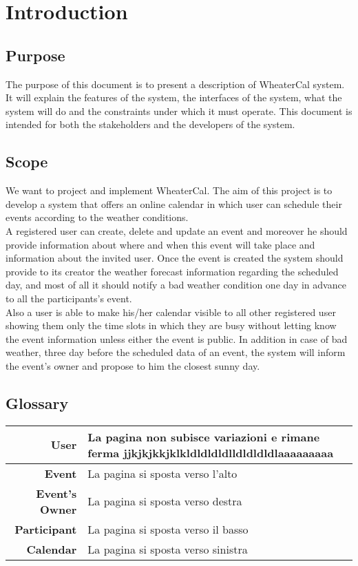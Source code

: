 \chapter{Introduction} \label{cap:cap1}

\section{Purpose}
The purpose of this document is to present a description of WheaterCal system. It will explain the features of the system, the interfaces of the system, what the system will do and the constraints under which it must operate.
This document is intended for both the stakeholders and the developers of the system.

\section{Scope}
We want to project and implement WheaterCal. The aim of this project is to develop a system that offers an online calendar in which user can schedule their events according to the weather conditions.\\ A registered user can create, delete and update an event and moreover he should provide information about where and when this event will take place and information about the invited user.
Once the event is created the system should provide to its creator the weather forecast information regarding the scheduled day, and most of all it should notify a bad weather condition one day in advance to all the participants's event.\\
Also a user is able to make his/her calendar visible to all other registered user showing them only the time slots in which they are busy without letting know the event information unless either the event is public.
In addition in case of bad weather, three day before the scheduled data of an event, the system will inform the event's owner and propose to him the closest sunny day.

\section{Glossary}
\begin{tabularx}{\linewidth}{|r|X|}
  \hline  {\bf User} & La pagina non subisce variazioni e rimane ferma jjkjkjkkjklkldldldldlldldldldlaaaaaaaaa\\ 
  \hline  {\bf Event} & La pagina si sposta verso l'alto \\ 
  \hline  {\bf Event's Owner} & La pagina si sposta verso destra\\
  \hline  {\bf Participant}&  La pagina si sposta verso il basso\\
  \hline  {\bf Calendar} & La pagina si sposta verso sinistra\\
  \hline
\end{tabularx}\\

